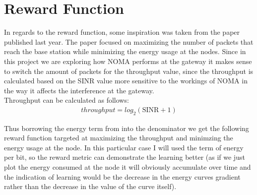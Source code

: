 \section{Reward Function}

In regards to the reward function, some inspiration was taken 
from the paper \cite{rl_lora_original} published last year. The paper 
focused on maximizing the number of packets that reach the base station
while minimizing the energy usage at the nodes. Since in this project
we are exploring how NOMA performs at the gateway it makes sense
to switch the amount of packets for the throughput value, since 
the throughput is calculated based on the SINR value more sensitive to
the workings of NOMA in the way it affects the interference at the
gateway.\\
Throughput can be calculated as follows:
\begin{align}
throughput = log_2(\text{SINR}+ 1)
\end{align}

Thus borrowing the energy term from \cite{rl_lora_original} into the 
denominator we get the following reward function targeted at 
maximizing the throughput and minimzing the energy usage at the node.
In this particular case I will used the term of energy per bit, so the reward metric can demonstrate the learning better (as if we just
plot the energy consumed at the node it will obviously accumulate
over time and the indication of learning would be the decrease
in the energy curves gradient rather than the decrease in the value of the curve itself). \\

